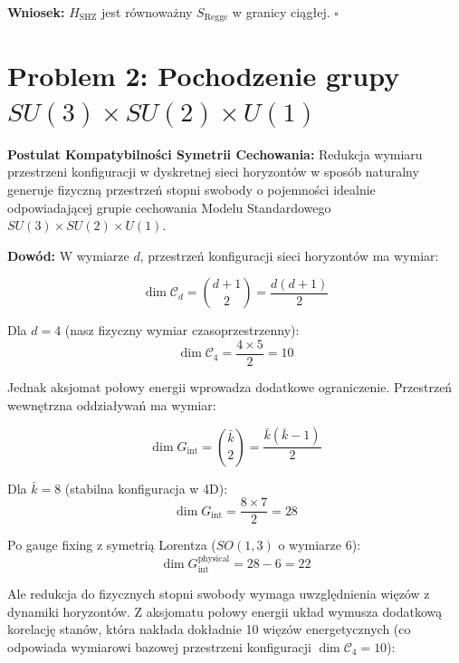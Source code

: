 \documentclass[11pt,a4paper]{article}
\begin{document}
\bigskip

\textbf{Wniosek:} $H_{\text{SHZ}}$ jest równoważny $S_{\text{Regge}}$ w granicy ciągłej. $\square$

\bigskip

\section{Problem 2: Pochodzenie grupy $SU(3) \times SU(2) \times U(1)$}

\bigskip

\textbf{Postulat Kompatybilności Symetrii Cechowania:} Redukcja wymiaru przestrzeni konfiguracji w dyskretnej sieci horyzontów w sposób naturalny generuje fizyczną przestrzeń stopni swobody o pojemności idealnie odpowiadającej grupie cechowania Modelu Standardowego $SU(3) \times SU(2) \times U(1)$.

\bigskip

\textbf{Dowód:} W wymiarze $d$, przestrzeń konfiguracji sieci horyzontów ma wymiar:

\begin{equation}
\dim \mathcal{C}_d = \binom{d+1}{2} = \frac{d(d+1)}{2}
\end{equation}

Dla $d=4$ (nasz fizyczny wymiar czasoprzestrzenny):
\begin{equation}
\dim \mathcal{C}_4 = \frac{4 \times 5}{2} = 10
\end{equation}

Jednak aksjomat połowy energii wprowadza dodatkowe ograniczenie. Przestrzeń wewnętrzna oddziaływań ma wymiar:

\begin{equation}
\dim G_{\text{int}} = \binom{\bar{k}}{2} = \frac{\bar{k}(\bar{k}-1)}{2}
\end{equation}

Dla $\bar{k} = 8$ (stabilna konfiguracja w 4D):
\begin{equation}
\dim G_{\text{int}} = \frac{8 \times 7}{2} = 28
\end{equation}

Po gauge fixing z symetrią Lorentza ($SO(1,3)$ o wymiarze 6):
\begin{equation}
\dim G_{\text{int}}^{\text{physical}} = 28 - 6 = 22
\end{equation}

Ale redukcja do fizycznych stopni swobody wymaga uwzględnienia więzów z dynamiki horyzontów. Z aksjomatu połowy energii układ wymusza dodatkową korelację stanów, która nakłada dokładnie 10 więzów energetycznych (co odpowiada wymiarowi bazowej przestrzeni konfiguracji $\dim \mathcal{C}_4 = 10$):
\end{document}
